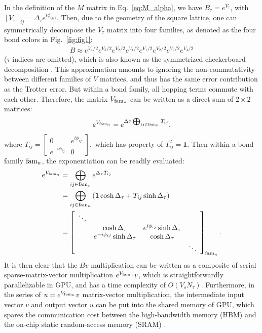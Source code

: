 \documentclass[aps,prl,twocolumn,superscriptaddress,showpacs,longbibliography]{revtex4-2}
\newcommand{\tx}[1]{\textmd{#1}}
\newcommand{\e}[1]{e^{#1}}
\begin{document}
In the definition of the $M$ matrix in Eq.~\eqref{eq:M_alpha}, we have $B_\tau = \e{V_\tau}$, with $\left[V_{\tau}\right]_{ij} = \Delta_\tau \e{i\phi_{ij, \tau}}$. Then, due to the geometry of the square lattice, one can symmetrically
decompose the $V_\tau$ matrix into four families,  as denoted as the four bond colors in Fig.~\ref{fig:fig1}:
\begin{align}
    B\approx e^{V_{4} / 2} e^{V_3 / 2} e^{V_2 / 2} e^{V_1 / 2} e^{V_1 / 2} e^{V_2 / 2} e^{V_3 / 2} e^{V_4 / 2}
\label{eq:eq24}
\end{align}
($\tau$ indices are omitted), which is also known as the symmetrized checkerboard decomposition \cite{XYXuU12018}. This approximation amounts to ignoring the non-commutativity between different families of $V$ matrices, and thus has the same error contribution as the Trotter error. But within a bond family, all hopping terms commute with each other. Therefore, the matrix $V_{\tx{fam}_n}$ can be written as a direct sum of $2\times2$ matrices:
\begin{align}
    e^{V_{\tx{fam}_n}} = e^{\Delta \tau \bigoplus_{i j \in \tx{fam}_n} T_{i j}},
\end{align}
where
$
T_{i j}  =\left[\begin{array}{cc}
0 & e^{i \phi_{i j}} \\
e^{-i \phi_{i j}} & 0
\end{array}\right],
$
which has property of $T_{ij}^2 = \mathbf{1}$.
Then within a bond family $\tx{fam}_n$, the exponentiation can be readily evaluated:
\begin{align}
    e^{V_{\tx{fam}_n}} &=\bigoplus_{i j \in \tx{fam}_n} e^{\Delta_\tau T_{i j}}  \\
& =\bigoplus_{i j \in \tx{fam}_n}\left(\mathbf{1}\cosh \Delta_\tau+T_{i j} \sinh \Delta_\tau\right) \\
& = \left[\begin{array}{cccc}
\ddots & & & \\
& \cosh \Delta_\tau & e^{i \phi_{i j}} \sinh \Delta_\tau & \\
& e^{-i \phi_{i j}} \sinh \Delta_\tau & \cosh \Delta_\tau & \\
& & & \ddots
\end{array}\right]_{\tx{fam}_n}.
\end{align}
It is then clear that the $B v$ multiplication can be written as a composite of serial sparse-matrix-vector multiplication $e^{V_{\tx{fam}_n}} v$, which is straightforwardly parallelizable in GPU, and has a time complexity of $O(V_sN_\tau)$. Furthermore, in the series of $u = e^{V_{\tx{fam}_n}} v$ matrix-vector multiplication, the intermediate input vector $v$ and output vector $u$ can be put into the shared memory of GPU, which spares the communication cost between the high-bandwidth memory (HBM) and the on-chip static random-access memory (SRAM) \cite{dao2022flashattention}.
\end{document}
